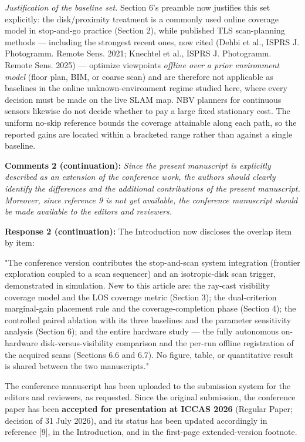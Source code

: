 \documentclass[11pt]{article}
\begin{document}
\emph{Justification of the baseline set.} Section 6's preamble now justifies this set explicitly: the disk/proximity treatment is a commonly used online coverage model in stop-and-go practice (Section 2), while published TLS scan-planning methods — including the strongest recent ones, now cited (Dehbi et al., ISPRS J. Photogramm. Remote Sens. 2021; Knechtel et al., ISPRS J. Photogramm. Remote Sens. 2025) — optimize viewpoints \emph{offline over a prior environment model} (floor plan, BIM, or coarse scan) and are therefore not applicable as baselines in the online unknown-environment regime studied here, where every decision must be made on the live SLAM map. NBV planners for continuous sensors likewise do not decide whether to pay a large fixed stationary cost. The uniform no-skip reference bounds the coverage attainable along each path, so the reported gains are located within a bracketed range rather than against a single baseline.

\medskip

\textbf{Comments 2 (continuation):} \emph{\emph{Since the present manuscript is explicitly described as an extension of the conference work, the authors should clearly identify the differences and the additional contributions of the present manuscript. Moreover, since reference 9 is not yet available, the conference manuscript should be made available to the editors and reviewers.}}

\textbf{Response 2 (continuation):} The Introduction now discloses the overlap item by item:

"The conference version contributes the stop-and-scan system integration (frontier exploration coupled to a scan sequencer) and an isotropic-disk scan trigger, demonstrated in simulation. New to this article are: the ray-cast visibility coverage model and the LOS coverage metric (Section 3); the dual-criterion marginal-gain placement rule and the coverage-completion phase (Section 4); the controlled paired ablation with its three baselines and the parameter sensitivity analysis (Section 6); and the entire hardware study — the fully autonomous on-hardware disk-versus-visibility comparison and the per-run offline registration of the acquired scans (Sections 6.6 and 6.7). No figure, table, or quantitative result is shared between the two manuscripts."

The conference manuscript has been uploaded to the submission system for the editors and reviewers, as requested. Since the original submission, the conference paper has been \textbf{accepted for presentation at ICCAS 2026} (Regular Paper; decision of 31 July 2026), and its status has been updated accordingly in reference [9], in the Introduction, and in the first-page extended-version footnote.
\end{document}
